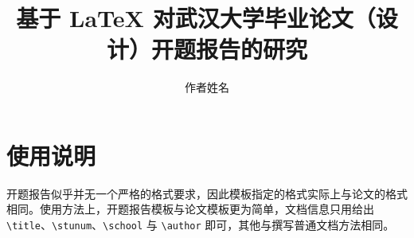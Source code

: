 \documentclass[opening]{whuthesis}
\title{基于 \LaTeX{} 对武汉大学毕业论文（设计）开题报告的研究}
\author{作者姓名}
\begin{document}
\maketitlepage

\section{使用说明}
开题报告似乎并无一个严格的格式要求，因此模板指定的格式实际上与论文的格式相同。使用方法上，开题报告模板与论文模板更为简单，文档信息只用给出 \verb|\title|、\verb|\stunum|、\verb|\school| 与 \verb|\author| 即可，其他与撰写普通文档方法相同。

\nocite{*}
\end{document}
